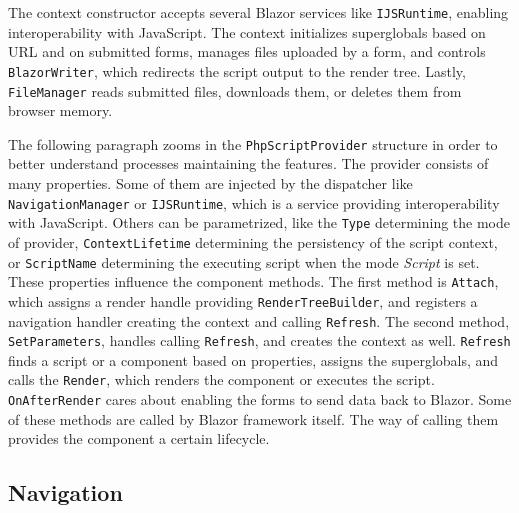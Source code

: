 The context constructor accepts several Blazor services like \texttt{IJSRuntime}, enabling interoperability with JavaScript.
The context initializes superglobals based on URL and on submitted forms, manages files uploaded by a form, and controls \texttt{BlazorWriter}, which redirects the script output to the render tree.
Lastly, \texttt{FileManager} reads submitted files, downloads them, or deletes them from browser memory.
\par
The following paragraph zooms in the \texttt{PhpScriptProvider} structure in order to better understand processes maintaining the features.
The provider consists of many properties.
Some of them are injected by the dispatcher like \texttt{NavigationManager} or \texttt{IJSRuntime}, which is a service providing interoperability with JavaScript.
Others can be parametrized, like the \texttt{Type} determining the mode of provider, \texttt{ContextLifetime} determining the persistency of the script context, or \texttt{ScriptName} determining the executing script when the mode \textit{Script} is set.
These properties influence the component methods.
The first method is \texttt{Attach}, which assigns a render handle providing \texttt{RenderTreeBuilder}, and registers a navigation handler creating the context and calling \texttt{Refresh}.
The second method, \texttt{SetParameters}, handles calling \texttt{Refresh}, and creates the context as well.
\texttt{Refresh} finds a script or a component based on properties, assigns the superglobals, and calls the \texttt{Render}, which renders the component or executes the script.
\texttt{OnAfterRender} cares about enabling the forms to send data back to Blazor.
Some of these methods are called by Blazor framework itself. The way of calling them provides the component a certain lifecycle.

\subsection{Navigation}

